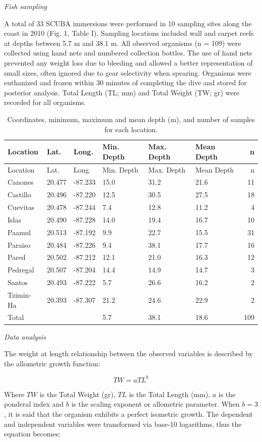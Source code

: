\documentclass[12pt,]{article}
\begin{document}
\emph{Fish sampling}

A total of 33 SCUBA immersions were performed in 10 sampling sites along
the coast in 2010 (Fig. 1, Table I). Sampling locations included wall
and carpet reefs at depths between 5.7 m and 38.1 m. All observed
organisms (n = 109) were collected using hand nets and numbered
collection bottles. The use of hand nets prevented any weight loss due
to bleeding and allowed a better representation of small sizes, often
ignored due to gear selectivity when spearing. Organisms were euthanized
and frozen within 30 minutes of completing the dive and stored for
posterior analysis. Total Length (TL; mm) and Total Weight (TW; gr) were
recorded for all organisms.

\begin{longtable}[]{@{}llllllr@{}}
\caption{Coordinates, minimum, maximum and mean depth (m), and number of
samples for each location.}\tabularnewline
\toprule
Location & Lat. & Long. & Min. Depth & Max. Depth & Mean Depth &
n\tabularnewline
\midrule
\endfirsthead
\toprule
Location & Lat. & Long. & Min. Depth & Max. Depth & Mean Depth &
n\tabularnewline
\midrule
\endhead
Canones & 20.477 & -87.233 & 15.0 & 31.2 & 21.6 & 11\tabularnewline
Castillo & 20.496 & -87.220 & 12.5 & 30.5 & 27.5 & 18\tabularnewline
Cuevitas & 20.478 & -87.244 & 7.4 & 12.8 & 11.2 & 4\tabularnewline
Islas & 20.490 & -87.228 & 14.0 & 19.4 & 16.7 & 10\tabularnewline
Paamul & 20.513 & -87.192 & 9.9 & 22.7 & 15.5 & 31\tabularnewline
Paraiso & 20.484 & -87.226 & 9.4 & 38.1 & 17.7 & 16\tabularnewline
Pared & 20.502 & -87.212 & 12.1 & 21.0 & 16.3 & 12\tabularnewline
Pedregal & 20.507 & -87.204 & 14.4 & 14.9 & 14.7 & 3\tabularnewline
Santos & 20.493 & -87.222 & 5.7 & 26.6 & 16.2 & 2\tabularnewline
Tzimin-Ha & 20.393 & -87.307 & 21.2 & 24.6 & 22.9 & 2\tabularnewline
Total & & & 5.7 & 38.1 & 18.6 & 109\tabularnewline
\bottomrule
\end{longtable}

\emph{Data analysis}

The weight at length relationship between the observed variables is
described by the allometric growth function:

\[TW = aTL^b\]

Where \(TW\) is the Total Weight (gr), \(TL\) is the Total Length (mm),
\(a\) is the ponderal index and \(b\) is the scaling exponent or
allometric parameter. When \(b = 3\), it is said that the organism
exhibits a perfect isometric growth. The dependent and independent
variables were transformed via base-10 logarithms, thus the equation
becomes:
\end{document}
